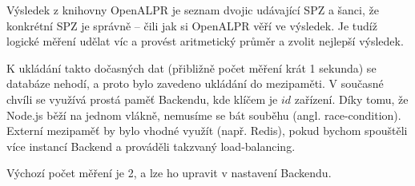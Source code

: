 Výsledek z knihovny OpenALPR je seznam dvojic udávající SPZ a šanci, že konkrétní SPZ je správně --
čili jak si OpenALPR věří ve výsledek. Je tudíž logické měření udělat víc a provést aritmetický průměr a
zvolit nejlepší výsledek.

K ukládání takto dočasných dat (přibližně počet měření krát 1 sekunda) se databáze nehodí, a proto
bylo zavedeno ukládání do mezipaměti. V současné chvíli se využívá prostá paměť Backendu,
kde klíčem je $id$ zařízení. Díky tomu, že Node.js běží na jednom vlákně, nemusíme se bát souběhu
(angl. race-condition). Externí mezipaměť by bylo vhodné využít (např. Redis), pokud bychom spouštěli více
instancí Backend a prováděli takzvaný load-balancing.

Výchozí počet měření je 2, a lze ho upravit v nastavení Backendu.
